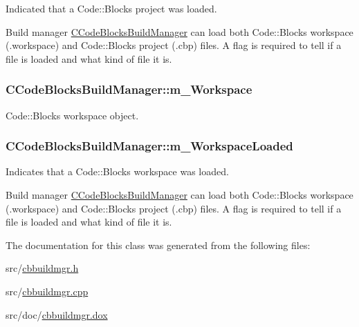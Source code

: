 Indicated that a Code\-::\-Blocks project was loaded. 

Build manager \hyperlink{classCCodeBlocksBuildManager}{C\-Code\-Blocks\-Build\-Manager} can load both Code\-::\-Blocks workspace (.workspace) and Code\-::\-Blocks project (.cbp) files. A flag is required to tell if a file is loaded and what kind of file it is. \hypertarget{classCCodeBlocksBuildManager_a7affd9de7002a93d1682986cd9236b6b}{
\subsubsection[{m\-\_\-\-Workspace}]{\setlength{\rightskip}{0pt plus 5cm}C\-Code\-Blocks\-Build\-Manager\-::m\-\_\-\-Workspace\hspace{0.3cm}{\ttfamily [private]}}}\label{classCCodeBlocksBuildManager_a7affd9de7002a93d1682986cd9236b6b}


Code\-::\-Blocks workspace object. 

\hypertarget{classCCodeBlocksBuildManager_ac85e500d80e44926bf0471466d21ad6c}{
\subsubsection[{m\-\_\-\-Workspace\-Loaded}]{\setlength{\rightskip}{0pt plus 5cm}C\-Code\-Blocks\-Build\-Manager\-::m\-\_\-\-Workspace\-Loaded\hspace{0.3cm}{\ttfamily [private]}}}\label{classCCodeBlocksBuildManager_ac85e500d80e44926bf0471466d21ad6c}


Indicates that a Code\-::\-Blocks workspace was loaded. 

Build manager \hyperlink{classCCodeBlocksBuildManager}{C\-Code\-Blocks\-Build\-Manager} can load both Code\-::\-Blocks workspace (.workspace) and Code\-::\-Blocks project (.cbp) files. A flag is required to tell if a file is loaded and what kind of file it is. 

The documentation for this class was generated from the following files\-:\begin{DoxyCompactItemize}
\item 
src/\hyperlink{cbbuildmgr_8h}{cbbuildmgr.\-h}\item 
src/\hyperlink{cbbuildmgr_8cpp}{cbbuildmgr.\-cpp}\item 
src/doc/\hyperlink{cbbuildmgr_8dox}{cbbuildmgr.\-dox}\end{DoxyCompactItemize}
